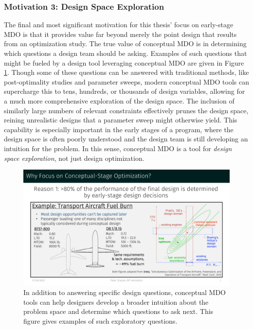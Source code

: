 \afterpage{\FloatBarrier}

\subsubsection*{Motivation 3: Design Space Exploration}

The final and most significant motivation for this thesis' focus on early-stage MDO is that it provides value far beyond merely the point design that results from an optimization study. The true value of conceptual MDO is in determining which questions a design team should be asking. Examples of such questions that might be fueled by a design tool leveraging conceptual MDO are given in Figure \ref{fig:motivation_3}. Though some of these questions can be answered with traditional methods, like post-optimality studies and parameter sweeps, modern conceptual MDO tools can supercharge this to tens, hundreds, or thousands of design variables, allowing for a much more comprehensive exploration of the design space. The inclusion of similarly large numbers of relevant constraints effectively prunes the design space, reining unrealistic designs that a parameter sweep might otherwise yield. This capability is especially important in the early stages of a program, where the design space is often poorly understood and the design team is still developing an intuition for the problem. In this sense, conceptual MDO is a tool for \textit{design space exploration}, not just design optimization.

\begin{figure}[H]
    \centering
    \includegraphics[page=5,trim=0cm 3cm 0cm 6.2cm, clip, width=\textwidth]{../figures/motivation_for_conceptual_MDO_focus.pdf}
    \caption{In addition to answering specific design questions, conceptual MDO tools can help designers develop a broader intuition about the problem space and determine which questions to ask next. This figure gives examples of such exploratory questions.}
    \label{fig:motivation_3}
\end{figure}

\afterpage{\FloatBarrier}

